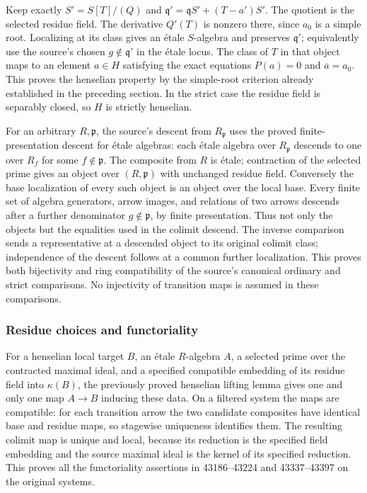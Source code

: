 Keep exactly \(S'=S[T]/(Q)\) and \(\mathfrak q'=\mathfrak qS'+(T-a')S'\). The quotient is the selected residue field. The derivative \(Q'(T)\) is nonzero there, since \(a_0\) is a simple root. Localizing at its class gives an étale \(S\)-algebra and preserves \(\mathfrak q'\); equivalently use the source's chosen \(g\notin\mathfrak q'\) in the étale locus. The class of \(T\) in that object maps to an element \(a\in H\) satisfying the exact equations \(P(a)=0\) and \(\overline a=a_0\). This proves the henselian property by the simple-root criterion already established in the preceding section. In the strict case the residue field is separably closed, so \(H\) is strictly henselian.

For an arbitrary \(R,\mathfrak p\), the source's descent from \(R_{\mathfrak p}\) uses the proved finite-presentation descent for étale algebras: each étale algebra over \(R_{\mathfrak p}\) descends to one over \(R_f\) for some \(f\notin\mathfrak p\). The composite from \(R\) is étale; contraction of the selected prime gives an object over \((R,\mathfrak p)\) with unchanged residue field. Conversely the base localization of every such object is an object over the local base. Every finite set of algebra generators, arrow images, and relations of two arrows descends after a further denominator \(g\notin\mathfrak p\), by finite presentation. Thus not only the objects but the equalities used in the colimit descend. The inverse comparison sends a representative at a descended object to its original colimit class; independence of the descent follows at a common further localization. This proves both bijectivity and ring compatibility of the source's canonical ordinary and strict comparisons. No injectivity of transition maps is assumed in these comparisons.

\subsubsection{Residue choices and functoriality}\label{residue-choices-and-functoriality}

For a henselian local target \(B\), an étale \(R\)-algebra \(A\), a selected prime over the contracted maximal ideal, and a specified compatible embedding of its residue field into \(\kappa(B)\), the previously proved henselian lifting lemma gives one and only one map \(A\to B\) inducing these data. On a filtered system the maps are compatible: for each transition arrow the two candidate composites have identical base and residue maps, so stagewise uniqueness identifies them. The resulting colimit map is unique and local, because its reduction is the specified field embedding and the source maximal ideal is the kernel of its specified reduction. This proves all the functoriality assertions in 43186--43224 and 43337--43397 on the original systems.

